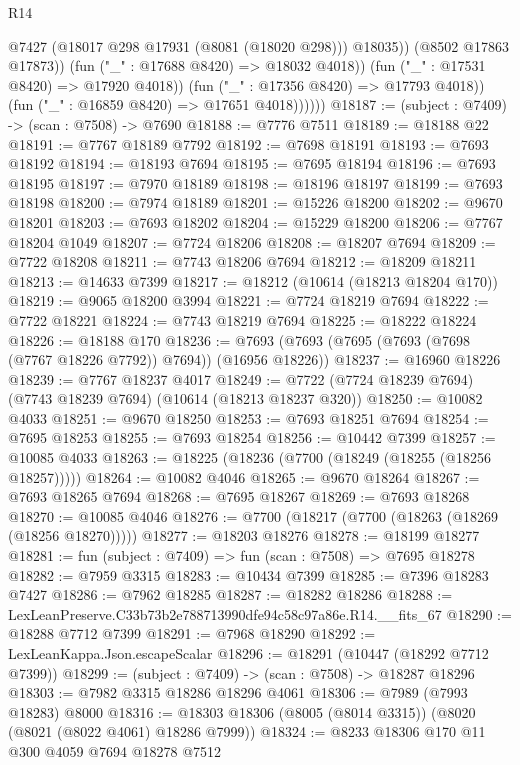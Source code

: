 \begin{lexlean}{R14}
\begin{coremodule}
                          @7427
                          (@18017 @298 @17931 (@8081 (@18020 @298)))
                          @18035))
                      (@8502 @17863 @17873))
                    (fun ("_" : @17688 @8420) => @18032 @4018))
                  (fun ("_" : @17531 @8420) => @17920 @4018))
                (fun ("_" : @17356 @8420) => @17793 @4018))
              (fun ("_" : @16859 @8420) => @17651 @4018))))))
@18187 := (subject : @7409) -> (scan : @7508) -> @7690
@18188 := @7776 @7511
@18189 := @18188 @22
@18191 := @7767 @18189 @7792
@18192 := @7698 @18191
@18193 := @7693 @18192
@18194 := @18193 @7694
@18195 := @7695 @18194
@18196 := @7693 @18195
@18197 := @7970 @18189
@18198 := @18196 @18197
@18199 := @7693 @18198
@18200 := @7974 @18189
@18201 := @15226 @18200
@18202 := @9670 @18201
@18203 := @7693 @18202
@18204 := @15229 @18200
@18206 := @7767 @18204 @1049
@18207 := @7724 @18206
@18208 := @18207 @7694
@18209 := @7722 @18208
@18211 := @7743 @18206 @7694
@18212 := @18209 @18211
@18213 := @14633 @7399
@18217 := @18212 (@10614 (@18213 @18204 @170))
@18219 := @9065 @18200 @3994
@18221 := @7724 @18219 @7694
@18222 := @7722 @18221
@18224 := @7743 @18219 @7694
@18225 := @18222 @18224
@18226 := @18188 @170
@18236 := @7693 (@7693 (@7695 (@7693 (@7698 (@7767 @18226 @7792)) @7694)) (@16956 @18226))
@18237 := @16960 @18226
@18239 := @7767 @18237 @4017
@18249 := @7722 (@7724 @18239 @7694) (@7743 @18239 @7694) (@10614 (@18213 @18237 @320))
@18250 := @10082 @4033
@18251 := @9670 @18250
@18253 := @7693 @18251 @7694
@18254 := @7695 @18253
@18255 := @7693 @18254
@18256 := @10442 @7399
@18257 := @10085 @4033
@18263 := @18225 (@18236 (@7700 (@18249 (@18255 (@18256 @18257)))))
@18264 := @10082 @4046
@18265 := @9670 @18264
@18267 := @7693 @18265 @7694
@18268 := @7695 @18267
@18269 := @7693 @18268
@18270 := @10085 @4046
@18276 := @7700 (@18217 (@7700 (@18263 (@18269 (@18256 @18270)))))
@18277 := @18203 @18276
@18278 := @18199 @18277
@18281 := fun (subject : @7409) => fun (scan : @7508) => @7695 @18278
@18282 := @7959 @3315
@18283 := @10434 @7399
@18285 := @7396 @18283 @7427
@18286 := @7962 @18285
@18287 := @18282 @18286
@18288 := LexLeanPreserve.C33b73b2e788713990dfe94c58c97a86e.R14.__fits_67
@18290 := @18288 @7712 @7399
@18291 := @7968 @18290
@18292 := LexLeanKappa.Json.escapeScalar
@18296 := @18291 (@10447 (@18292 @7712 @7399))
@18299 := (subject : @7409) -> (scan : @7508) -> @18287 @18296
@18303 := @7982 @3315 @18286 @18296 @4061
@18306 := @7989 (@7993 @18283) @8000
@18316 := @18303 @18306 (@8005 (@8014 @3315)) (@8020 (@8021 (@8022 @4061) @18286 @7999))
@18324 := @8233 @18306 @170 @11 @300 @4059 @7694 @18278 @7512

\end{coremodule}
\end{lexlean}
